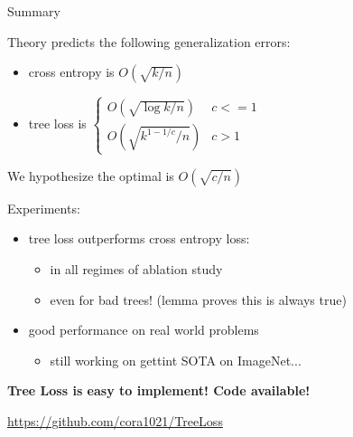 \begin{frame}{Summary}

Theory predicts the following generalization errors:
\begin{itemize}
\item cross entropy is $O(\sqrt{k/n})$
\item tree loss is $\begin{cases}O(\sqrt{\log k/n})&c<=1\\O(\sqrt{k^{1-1/c}/n})&c>1\end{cases}$%
\end{itemize}

\vspace{0.1in}
We hypothesize the optimal is $O(\sqrt{c/n})$

\vspace{0.1in}
Experiments:
\begin{itemize}
\item tree loss outperforms cross entropy loss:
\begin{itemize}
\item in all regimes of ablation study
\item even for bad trees! (lemma proves this is always true)
\end{itemize}
\item good performance on real world problems
\begin{itemize}
\item still working on gettint SOTA on ImageNet...
\end{itemize}
\end{itemize}

\vspace{0.1in}
\textbf{Tree Loss is easy to implement! Code available!}

\url{https://github.com/cora1021/TreeLoss}
\end{frame}
